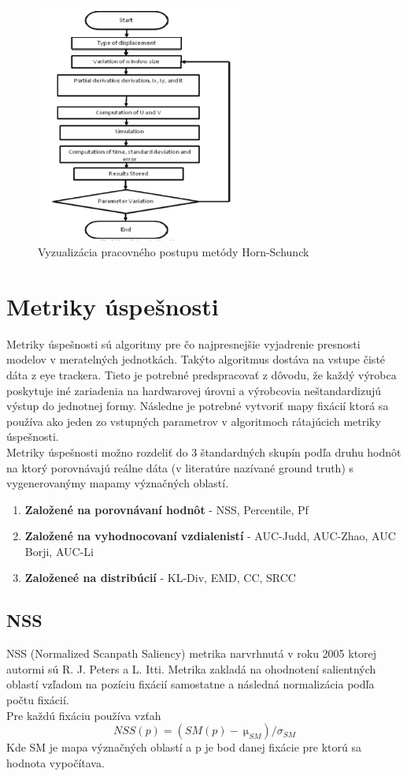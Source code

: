 \begin{figure}[H]
  \centering
  \includegraphics[width=7cm]{pics/horn-schunck.png}
  \caption{Vyzualizácia pracovného postupu metódy Horn-Schunck}
\end{figure}
\vspace{10mm}

\section{Metriky úspešnosti}
Metriky úspešnosti sú algoritmy pre čo najpresnejšie vyjadrenie presnosti modelov v meratelných jednotkách.
Takýto algoritmus dostáva na vstupe čisté dáta z eye trackera.
Tieto je potrebné predspracovať z dôvodu, že každý výrobca poskytuje iné zariadenia na hardwarovej úrovni a výrobcovia neštandardizujú výstup do jednotnej formy.
Následne je potrebné vytvoriť mapy fixácií ktorá sa používa ako jeden zo vstupných parametrov v algoritmoch rátajúcich metriky úspešnosti.
\\
Metriky úspešnosti možno rozdeliť do 3 štandardných skupín podľa druhu hodnôt na ktorý porovnávajú reálne dáta (v literatúre nazívané ground truth) s vygenerovanýmy mapamy význačných oblastí\cite{metrics-1}.
\begin{enumerate}
  \item\textbf{Založené na porovnávaní hodnôt} - NSS, Percentile, Pf
  \item\textbf{Založené na vyhodnocovaní vzdialenistí} - AUC-Judd, AUC-Zhao, AUC Borji, AUC-Li
  \item\textbf{Založeneé na distribúcií} - KL-Div, EMD, CC, SRCC
\end{enumerate}

\subsection{NSS}
NSS (Normalized Scanpath Saliency) metrika narvrhnutá v roku 2005 ktorej autormi sú R.
J.
Peters a L.
Itti.
Metrika zakladá na ohodnotení salientných oblastí vzľadom na pozíciu fixácií samostatne a následná normalizácia podľa počtu fixácií.
\\
Pre každú fixáciu používa vzťah
  \begin{equation}
    NSS(p) =  (SM(p)-\SI{}{\micro}_{SM}) / 	\sigma_{SM}
  \end{equation}
Kde SM je mapa význačných oblastí a p je bod danej fixácie pre ktorú sa hodnota vypočítava.

